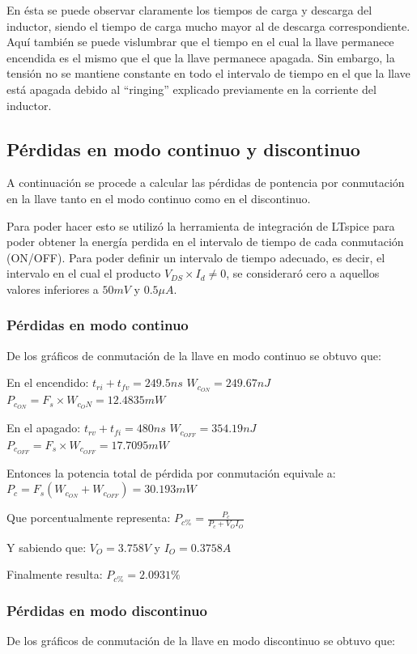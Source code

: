 \documentclass[e4_tp1_main.tex]{subfiles}
\begin{document}
		En ésta se puede observar claramente los tiempos de carga y descarga del inductor, siendo el tiempo de  carga mucho mayor al de descarga correspondiente. Aquí también se puede vislumbrar que el tiempo en el cual la llave permanece encendida es el mismo que el que la llave permanece apagada. Sin embargo, la tensión no se mantiene constante en todo el intervalo de tiempo en el que la llave está apagada debido al ``ringing'' explicado previamente en la corriente del inductor.
		

	\subsection{Pérdidas en modo continuo y discontinuo}
	A continuación se procede a calcular las pérdidas de pontencia por conmutación en la llave tanto en el modo continuo como en el discontinuo. 
	
	Para poder hacer esto se utilizó la herramienta de integración de LTspice para poder obtener la energía perdida en el intervalo de tiempo de cada conmutación (ON/OFF). Para poder definir un intervalo de tiempo adecuado, es decir, el intervalo en el cual el producto $V_{DS}\times I_d\neq 0$, se consideraró cero a aquellos valores inferiores a $50mV$ y $0.5\mu A$.
	
	\subsubsection{Pérdidas en modo continuo}
	De los gráficos de conmutación de la llave en modo continuo se obtuvo que:
	
	En el encendido: $t_{ri}+t_{fv}=249.5ns$  \quad $W_{c_{ON}}=249.67nJ$ \quad \quad$P_{c_{ON}}=F_s\times W_{c_ON}=12.4835mW$

	En el apagado: $t_{rv}+t_{fi}=480ns$ \quad\quad $W_{c_{OFF}}=354.19nJ$ \quad\quad $P_{c_{OFF}}=F_s\times W_{c_{OFF}}=17.7095mW$
	
	Entonces la potencia total de pérdida por conmutación equivale a: $P_c=F_s(W_{c_{ON}}+W_{c_{OFF}})=30.193mW$
	
	Que porcentualmente representa: $P_{c\%}=\frac{P_c}{P_c+V_OI_O}$
	
	Y sabiendo que: $V_O=3.758V$ y $I_O=0.3758A$
	
	Finalmente resulta:	$P_{c\%}=2.0931\%$
	
	
	
	\subsubsection{Pérdidas en modo discontinuo}
	De los gráficos de conmutación de la llave en modo discontinuo se obtuvo que:
	
\end{document}
